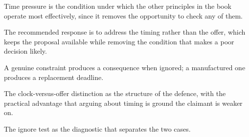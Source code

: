 

\begin{distilled}
  \item Time pressure is the condition under which the other principles in the book operate most effectively, since it removes the opportunity to check any of them.
  \item The recommended response is to address the timing rather than the offer, which keeps the proposal available while removing the condition that makes a poor decision likely.
  \item A genuine constraint produces a consequence when ignored; a manufactured one produces a replacement deadline.
\end{distilled}

\begin{unique}
  \item The clock-versus-offer distinction as the structure of the defence, with the practical advantage that arguing about timing is ground the claimant is weaker on.
  \item The ignore test as the diagnostic that separates the two cases.
\end{unique}

